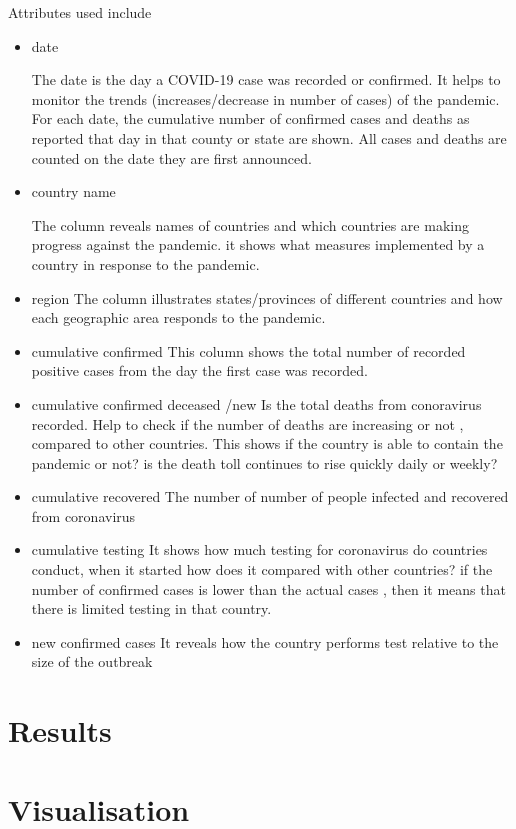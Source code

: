 \documentclass[12pt,letterpaper, twoside]{article}
\begin{document}
Attributes used include
\begin{itemize}
    \item date
    
    The date is the day a COVID-19 case was recorded or confirmed. It helps to monitor the trends (increases/decrease in number of cases) of the pandemic.
    For each date, the cumulative number of confirmed cases and deaths as reported that day in that county or state are shown. All cases and deaths are counted on the date they are first announced.
    
    \item country name
    
    The column reveals names of countries and which countries are making progress against the pandemic. it shows what measures implemented by a country in response to the pandemic.
    
    \item region 
    The column illustrates states/provinces of different countries and how each geographic area responds to the pandemic.
    
    \item cumulative confirmed
      This column shows the total number of recorded positive cases from the day the first case was recorded. 
      
    \item cumulative confirmed deceased /new 
    Is the total deaths from conoravirus recorded. Help to check if the number of deaths are increasing or not , compared to other countries. This shows if the country is able to contain the pandemic or not? is the death toll continues to rise quickly daily or weekly?
    
    \item cumulative recovered
    The number of number of people infected and recovered from coronavirus
      
      \item cumulative testing
      It shows how much testing for coronavirus do countries conduct, when it started how does it compared with other countries? if the number of confirmed cases is lower than the actual cases , then it means that there is limited testing in that country.
      
      \item new confirmed cases
      It reveals how the country performs test relative to the size of the outbreak
    
\end{itemize}



\section{Results}
\section{Visualisation}
\end{document}
